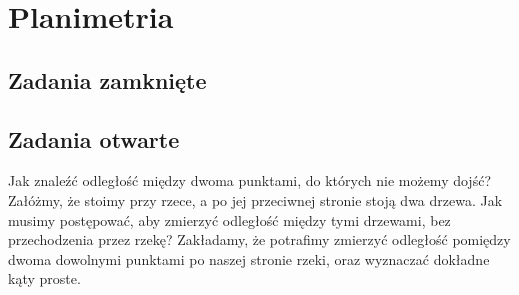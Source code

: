 \setcounter{parc}{0}
\addtocounter{chapc}{1}

\chapter{Planimetria}

\section{Zadania zamknięte}

\section{Zadania otwarte}

\zadanie Jak znaleźć odległość między dwoma punktami, do których nie możemy dojść? Załóżmy, że stoimy przy rzece, a po jej przeciwnej stronie stoją dwa drzewa. Jak musimy postępować, aby zmierzyć odległość między tymi drzewami, bez przechodzenia przez rzekę? Zakładamy, że potrafimy zmierzyć odległość pomiędzy dwoma dowolnymi punktami po naszej stronie rzeki, oraz wyznaczać dokładne kąty proste.